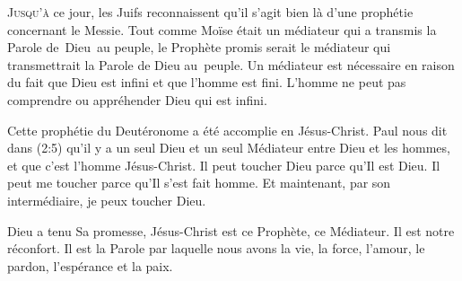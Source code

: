 \dvrule







\lettrine{J}{usqu'à} ce jour, les Juifs reconnaissent
 qu'il s'agit bien là d'une prophétie concernant le Messie.
 Tout comme Moïse était un médiateur qui a transmis la Parole de~Dieu~au peuple,
 le Prophète promis serait le médiateur qui transmettrait la Parole de Dieu
 au~peuple.
 Un médiateur est nécessaire en raison du fait que Dieu est infini
 et que l'homme est fini.
 L'homme ne peut pas comprendre ou appréhender Dieu qui est infini.


Cette prophétie du Deutéronome a été accomplie en Jésus-Christ.
 Paul nous dit dans (2:5)
 qu'il y a un seul Dieu
 et un seul Médiateur entre Dieu et les hommes,
 et que c'est l'homme Jésus-Christ. Il peut toucher Dieu parce qu'Il est Dieu.
 Il peut me toucher parce qu'Il s'est fait homme.
 Et maintenant, par son intermédiaire, je peux toucher Dieu.

Dieu a tenu Sa promesse, Jésus-Christ est ce Prophète, ce Médiateur.
 Il est notre réconfort. Il est la Parole par laquelle nous avons la vie,
 la force, l'amour, le pardon, l'espérance et la paix. 

